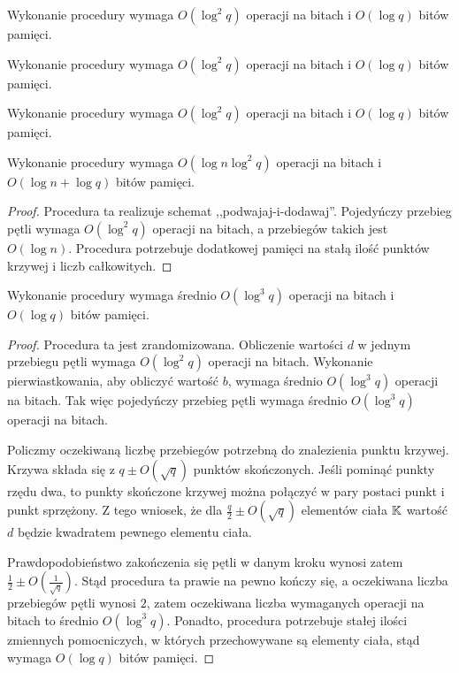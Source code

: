 \begin{fact}
Wykonanie procedury 
wymaga $O(\log^2 q)$ operacji na bitach i $O(\log q)$ bitów pamięci.
\end{fact}

\begin{fact}
Wykonanie procedury 
wymaga $O(\log^2 q)$ operacji na bitach i $O(\log q)$ bitów pamięci.
\end{fact}

\begin{fact}
Wykonanie procedury 
wymaga $O(\log^2 q)$ operacji na bitach i $O(\log q)$ bitów pamięci.
\end{fact}

\begin{lemma}
Wykonanie procedury 
wymaga $O(\log n \log^2 q)$ operacji na bitach
i $O(\log n + \log q)$ bitów pamięci.
\end{lemma}

\begin{proof}
Procedura ta realizuje schemat ,,podwajaj-i-dodawaj''.
Pojedyńczy przebieg pętli  wymaga
$O(\log^2 q)$ operacji na bitach,
a przebiegów takich jest $O(\log n)$.
Procedura potrzebuje dodatkowej pamięci na stałą ilość
punktów krzywej i liczb całkowitych.
\end{proof}

\begin{lemma}
Wykonanie procedury 
wymaga średnio \linebreak
$O(\log^3 q)$ operacji na bitach i $O(\log q)$ bitów pamięci.
\end{lemma}

\begin{proof}
Procedura ta jest zrandomizowana.
Obliczenie wartości $d$ w jednym przebiegu pętli
wymaga $O(\log^2 q)$ operacji na bitach.
Wykonanie pierwiastkowania, aby obliczyć wartość $b$,
wymaga średnio $O(\log^3 q)$ operacji na bitach.
Tak więc pojedyńczy przebieg pętli 
wymaga średnio $O(\log^3 q)$ operacji na bitach.

\noindent
Policzmy oczekiwaną liczbę przebiegów potrzebną do znalezienia punktu krzywej.
Krzywa składa się z $q \pm O(\sqrt{q})$ punktów skończonych.
Jeśli pominąć punkty rzędu dwa,
to punkty skończone krzywej można połączyć w pary postaci
punkt i punkt sprzężony.
Z tego wniosek, że dla $\frac{q}{2} \pm O(\sqrt{q})$ elementów ciała $\mathbb{K}$
wartość $d$ będzie kwadratem pewnego elementu ciała.

\noindent
Prawdopodobieństwo zakończenia się pętli w danym kroku
wynosi zatem $\frac{1}{2} \pm O(\frac{1}{\sqrt{q}})$.
Stąd procedura ta prawie na pewno kończy się,
a oczekiwana liczba przebiegów pętli  wynosi $2$,
zatem oczekiwana liczba wymaganych operacji na bitach
to średnio $O(\log^3 q)$.
Ponadto, procedura potrzebuje stałej ilości zmiennych pomocniczych,
w których przechowywane są elementy ciała,
stąd wymaga $O(\log q)$ bitów pamięci.
\end{proof}

